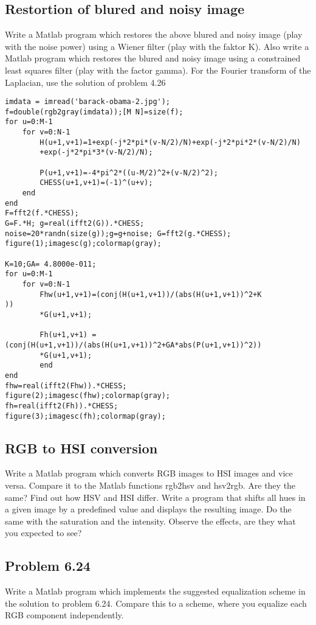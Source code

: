 \subsection{Restortion of blured and noisy image}
Write a Matlab program which restores the above blured and noisy image (play
with the noise power) using a Wiener filter (play with the faktor K). Also write a Matlab program which restores the blured and noisy image using a constrained least squares filter (play with the factor gamma). For the Fourier transform of the Laplacian, use the solution of problem 4.26
\begin{lstlisting}
imdata = imread('barack-obama-2.jpg');
f=double(rgb2gray(imdata));[M N]=size(f);
for u=0:M-1
    for v=0:N-1
        H(u+1,v+1)=1+exp(-j*2*pi*(v-N/2)/N)+exp(-j*2*pi*2*(v-N/2)/N)
        +exp(-j*2*pi*3*(v-N/2)/N);
        
        P(u+1,v+1)=-4*pi^2*((u-M/2)^2+(v-N/2)^2);
        CHESS(u+1,v+1)=(-1)^(u+v);
    end
end
F=fft2(f.*CHESS);
G=F.*H; g=real(ifft2(G)).*CHESS;
noise=20*randn(size(g));g=g+noise; G=fft2(g.*CHESS);
figure(1);imagesc(g);colormap(gray);

K=10;GA= 4.8000e-011;
for u=0:M-1
    for v=0:N-1
        Fhw(u+1,v+1)=(conj(H(u+1,v+1))/(abs(H(u+1,v+1))^2+K                   ))
        *G(u+1,v+1);
        
        Fh(u+1,v+1) =(conj(H(u+1,v+1))/(abs(H(u+1,v+1))^2+GA*abs(P(u+1,v+1))^2))
        *G(u+1,v+1);
        end
end
fhw=real(ifft2(Fhw)).*CHESS;
figure(2);imagesc(fhw);colormap(gray);
fh=real(ifft2(Fh)).*CHESS;
figure(3);imagesc(fh);colormap(gray);
\end{lstlisting}
\subsection{RGB to HSI conversion}
Write a Matlab program which converts RGB images to HSI images and vice versa.
Compare it to the Matlab functions rgb2hsv and hsv2rgb. Are they the same?  Find out how HSV and HSI differ. Write a program that shifts all hues in a given image by a predefined value and displays the resulting image. Do the same with the saturation and the intensity. Observe the effects, are they what you expected to see?
\subsection{Problem 6.24}
Write a Matlab program which implements the suggested equalization scheme in the
solution to problem 6.24.  Compare this to a scheme, where you equalize each RGB component independently.

